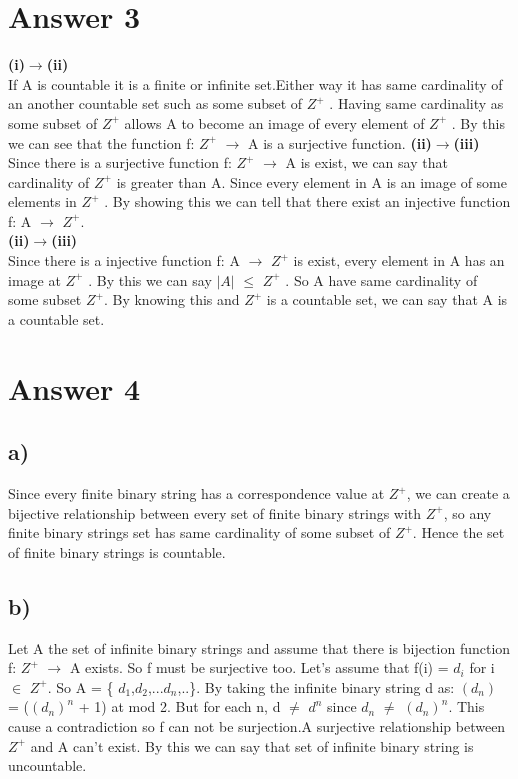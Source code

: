 \documentclass[11pt]{article}
\begin{document}
\section*{Answer 3}

\textbf{(i)$\rightarrow$(ii)}\\
If A is countable it is a finite or infinite set.Either way it has same cardinality of an another countable set such as some subset of $Z^+$ . Having same cardinality as some subset of $Z^+$ allows A to become an image of every element of $Z^+$ . By this we can see that the function f:  $Z^+$  $\rightarrow$ A is a surjective function.
\textbf{(ii)$\rightarrow$(iii)}\\
Since there is a surjective function f:  $Z^+$  $\rightarrow$ A is exist, we can say that cardinality of $Z^+$ is greater than A. Since every element in A is an image of some elements in $Z^+$ . By showing this we can tell that there exist an injective function f: A $\rightarrow$ $Z^+$. \\
\textbf{(ii)$\rightarrow$(iii)}\\
Since there is a injective function f: A $\rightarrow$ $Z^+$ is exist, every element in A has an image at $Z^+$ . By this we can say $|A|$ $\leq$ $Z^+$ . So A have same cardinality of some subset $Z^+$. By knowing this and $Z^+$ is a countable set, we can say that A is a countable set.


\section*{Answer 4}
\subsection*{a)}
Since every finite binary string has a correspondence value at $Z^+$, we can create a bijective relationship between every set of finite binary strings with $Z^+$, so any finite binary strings set has same cardinality of some subset of $Z^+$. Hence the set of finite binary strings is countable.
\subsection*{b)}

Let A the set of infinite binary strings and assume that there is bijection function f: $Z^+$ $\rightarrow$ A exists. So f must be surjective too. Let's assume that f(i) = $d_i$ for i $\in$ $Z^+$. So A = \{ $d_1$,$d_2$,...$d_n$,..\}. By taking the infinite binary string d as: $(d_n)$ = ($(d_n)^n$ + 1) at mod 2. But for each n, d $\neq$ $d^n$ since $d_n$ $\neq$ $(d_n)^n$. This cause a contradiction so f can not be surjection.A surjective relationship between $Z^+$ and A can't exist. By this we can say that set of infinite binary string is uncountable.
\end{document}
